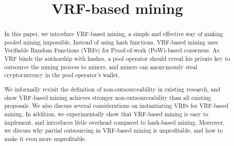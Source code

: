 \documentclass[conference]{IEEEtran}
\begin{document}
\title{VRF-based mining}


\maketitle

\begin{abstract}
  In this paper, we introduce VRF-based mining, a simple and effective way of making pooled mining impossible.
  Instead of using hash functions, VRF-based mining uses Verifiable Random Functions (VRFs) for Proof-of-work (PoW)-based consensus.
  As VRF binds the authorship with hashes, a pool operator should reveal his private key to outsource the mining process to miners, and miners can anonymously steal cryptocurrency in the pool operator's wallet.
  
  We informally revisit the definition of non-outsourceability in existing research, and show VRF-based mining achieves stronger non-outsourceability than all existing proposals.
  We also discuss several considerations on instantiating VRFs for VRF-based mining.
  In addition, we experimentally show that VRF-based mining is easy to implement, and introduces little overhead compared to hash-based mining.
  Moreover, we discuss why partial outsourcing in VRF-based mining is unprofitable, and how to make it even more unprofitable.
\end{abstract}















\appendix

\end{document}
